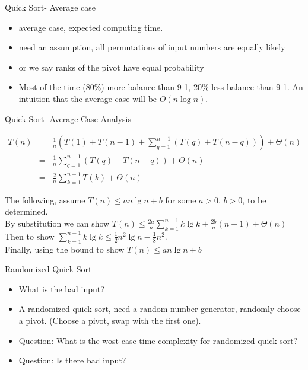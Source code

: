 \documentclass{beamer}
\begin{document}
\begin{frame}{}
\begin{center}
Quick Sort- Average case
\end{center}
\begin{itemize}
\item average case, expected computing time.  
\item need an assumption, all permutations of input numbers are equally likely
\item or we say ranks of the pivot have equal probability
\item Most of the time (80\%) more balance than 9-1, 20\% less balance than
 9-1.  An intuition that the average case will be $O(n\log n)$.
\end{itemize}
\end{frame}

\begin{frame}{}
\begin{center}
Quick Sort- Average Case Analysis
\end{center}
{ 
\begin{eqnarray*}
T(n) &=& \frac{1}{n}(T(1)+T(n-1)+\sum_{q=1}^{n-1}(T(q)+T(n-q)))+\Theta(n) \\
&=&\frac{1}{n}\sum_{q=1}^{n-1}(T(q)+T(n-q))+\Theta(n) \\
&=&\frac{2}{n}\sum_{k=1}^{n-1}T(k)+\Theta(n)
\end{eqnarray*}
}
\end{frame}

\begin{frame}{}
The following, assume $T(n)\le an\lg n+b$ for some $a>0$, $b>0$, to be 
 determined.  \\
By substitution we can show $T(n)\le \frac{2a}{n}\sum_{k=1}^{n-1}k\lg k +
 \frac{2b}{n}(n-1)+\Theta(n)$ \\
Then to show 
 $\sum_{k=1}^{n-1}k\lg k \le \frac{1}{2}n^2\lg n -\frac{1}{8}n^2.$\\
Finally, using the bound to show $T(n)\le an\lg n +b$
\end{frame}

\begin{frame}{}
\begin{center}
Randomized Quick Sort
\end{center}
\begin{itemize}
\item What is the bad input? 
\item A randomized quick sort, need a random number generator, randomly choose
 a pivot.  (Choose a pivot, swap with the first one).  
\item Question: What is the wost case time complexity for randomized 
quick sort?
\item Question: Is there bad input?
\end{itemize}
\end{frame}
\end{document}
